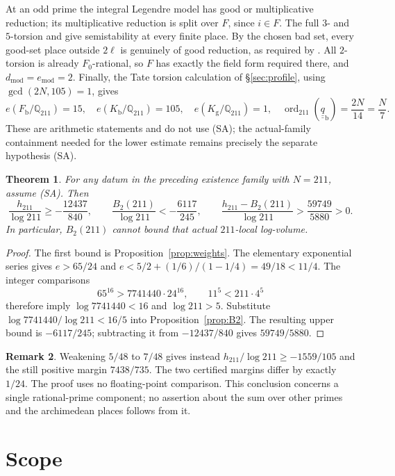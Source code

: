 \documentclass[11pt]{article}
\theoremstyle{plain}
\newtheorem{theorem}{Theorem}[section]
\theoremstyle{definition}
\newtheorem{remark}[theorem]{Remark}
\newcommand{\SA}{\textup{(SA)}}
\newcommand{\ord}{\operatorname{ord}}
\begin{document}
At an odd prime the integral Legendre model has good or multiplicative
reduction; its multiplicative reduction is split over $F$, since $i\in F$.
The full $3$- and $5$-torsion and \cite[Proposition 1.8(v)]{IUT4} give
semistability at every finite place.  By the chosen bad set, every good-set
place outside $2\ell$ is genuinely of good reduction, as required by
\cite[Theorem 1.10]{IUT4}.
All $2$-torsion is already $F_0$-rational, so $F$ has exactly the field form
required there, and $d_{\mathrm{mod}}=e_{\mathrm{mod}}=2$.
Finally, the Tate torsion calculation of \S\ref{sec:profile}, using
$\gcd(2N,105)=1$, gives
\[
 e(F_{\mathrm b}/\mathbb Q_{211})=15,\quad
 e(K_{\mathrm b}/\mathbb Q_{211})=105,\quad
 e(K_{\mathrm g}/\mathbb Q_{211})=1,\quad
 \ord_{211}(\underline{\underline q}_{\mathrm b})=\frac{2N}{14}=\frac N7.
\]
These are arithmetic statements and do not use \SA{}; the actual-family
containment needed for the lower estimate remains precisely the separate
hypothesis \SA{}.

\begin{theorem}\label{thm:averaged}
For any datum in the preceding existence family with $N=211$, assume
\SA{}.  Then
\[
 \frac{h_{211}}{\log211}\ge-\frac{12437}{840},\qquad
 \frac{B_2(211)}{\log211}<-\frac{6117}{245},\qquad
 \frac{h_{211}-B_2(211)}{\log211}>\frac{59749}{5880}>0.
\]
In particular, $B_2(211)$ cannot bound that actual $211$-local log-volume.
\end{theorem}
\begin{proof}
The first bound is Proposition~\ref{prop:weights}.
The elementary exponential series gives
$e>65/24$ and
$e<5/2+(1/6)/(1-1/4)=49/18<11/4$.
The integer comparisons
\[
 65^{16}>7741440\cdot24^{16},\qquad 11^5<211\cdot4^5
\]
therefore imply $\log7741440<16$ and $\log211>5$.
Substitute $\log7741440/\log211<16/5$ into
Proposition~\ref{prop:B2}.  The resulting upper bound is $-6117/245$;
subtracting it from $-12437/840$ gives $59749/5880$.
\end{proof}

\begin{remark}
Weakening $5/48$ to $7/48$ gives instead
$h_{211}/\log211\ge-1559/105$ and the still positive margin
$7438/735$.  The two certified margins differ by exactly $1/24$.
The proof uses no floating-point comparison.  This conclusion concerns a
single rational-prime component; no assertion about the sum over other
primes and the archimedean places follows from it.
\end{remark}

\section{Scope}\label{sec:scope}
\end{document}
